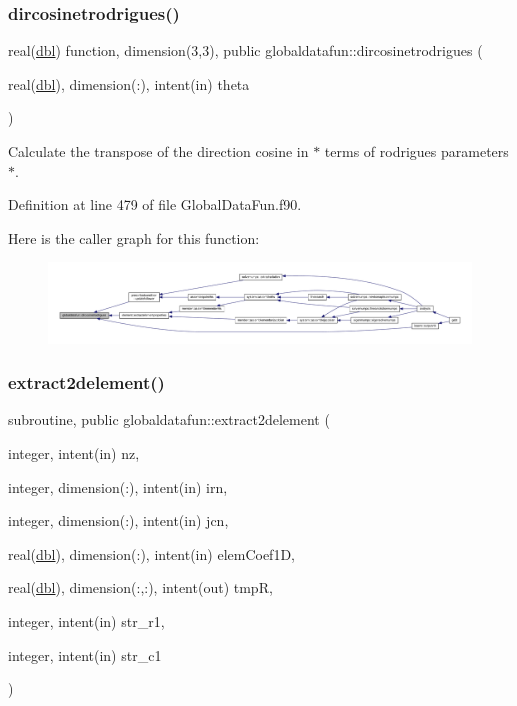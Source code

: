 \subsubsection{\texorpdfstring{dircosinetrodrigues()}{dircosinetrodrigues()}}
{\footnotesize\ttfamily real(\hyperlink{namespaceglobaldatafun_a5008801201dd34f2af8eae07756befb4}{dbl}) function, dimension(3,3), public globaldatafun\+::dircosinetrodrigues (\begin{DoxyParamCaption}\item[{real(\hyperlink{namespaceglobaldatafun_a5008801201dd34f2af8eae07756befb4}{dbl}), dimension(\+:), intent(in)}]{theta }\end{DoxyParamCaption})}



Calculate the transpose of the direction cosine in $\ast$ terms of rodrigues parameters $\ast$. 



Definition at line 479 of file Global\+Data\+Fun.\+f90.

Here is the caller graph for this function\+:\nopagebreak
\begin{figure}[H]
\begin{center}
\leavevmode
\includegraphics[width=350pt]{namespaceglobaldatafun_a79e0439ba9c19e8c9bd28d76417cc4db_icgraph}
\end{center}
\end{figure}
\mbox{\label{namespaceglobaldatafun_a8068755a2ac0857cf1dfc681e43af3a8}} 
\subsubsection{\texorpdfstring{extract2delement()}{extract2delement()}}
{\footnotesize\ttfamily subroutine, public globaldatafun\+::extract2delement (\begin{DoxyParamCaption}\item[{integer, intent(in)}]{nz,  }\item[{integer, dimension(\+:), intent(in)}]{irn,  }\item[{integer, dimension(\+:), intent(in)}]{jcn,  }\item[{real(\hyperlink{namespaceglobaldatafun_a5008801201dd34f2af8eae07756befb4}{dbl}), dimension(\+:), intent(in)}]{elem\+Coef1D,  }\item[{real(\hyperlink{namespaceglobaldatafun_a5008801201dd34f2af8eae07756befb4}{dbl}), dimension(\+:,\+:), intent(out)}]{tmpR,  }\item[{integer, intent(in)}]{str\+\_\+r1,  }\item[{integer, intent(in)}]{str\+\_\+c1 }\end{DoxyParamCaption})}



